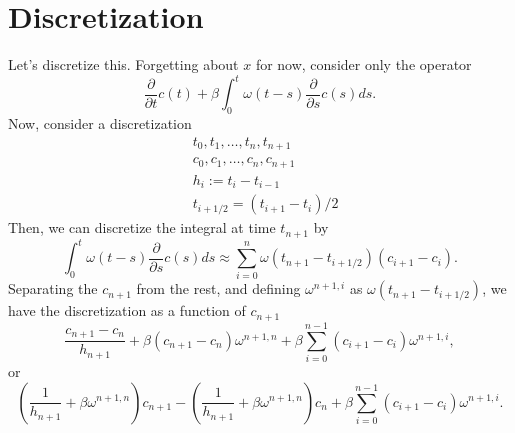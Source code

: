 \documentclass[]{article}
\newcommand{\pderiv}[2]{\frac{\partial #1}{\partial #2}}
\begin{document}
\section{Discretization}
Let's discretize this. Forgetting about $x$ for now, consider only the operator
\begin{equation}
	\pderiv{}{t} c(t) + \beta \int_0^t \omega(t - s) \pderiv{}{s} c(s) ds.
\end{equation}
Now, consider a discretization
\begin{equation}
	\begin{split}
	& t_0, t_1, \ldots, t_n, t_{n+1} \\
	& c_0, c_1, \ldots, c_n, c_{n+1} \\
	& h_i := t_{i} - t_{i-1} \\
	& t_{i+1/2} = (t_{i+1} - t_{i})/2
	\end{split}
\end{equation}
Then, we can discretize the integral at time $t_{n+1}$ by
\begin{equation}
	\int_0^t \omega(t - s) \pderiv{}{s} c(s) ds \approx \sum_{i=0}^n \omega(t_{n+1} - t_{i+{1/2}}) (c_{i+1} - c_{i}).
\end{equation}
Separating the $c_{n+1}$ from the rest, and defining $\omega^{n+1, i}$ as $\omega(t_{n+1} - t_{i+{1/2}})$, we have the discretization as a function of $c_{n+1}$
\begin{equation}
	\frac{c_{n+1} - c_{n}}{h_{n+1}} + \beta (c_{n+1} - c_n) \omega^{n+1, n} + \beta \sum_{i=0}^{n-1} (c_{i+1} - c_i) \omega^{n+1, i},
\end{equation}
or
\begin{equation}
	\left(\frac{1}{h_{n+1}} + \beta \omega^{n+1, n} \right) c_{n+1} - \left(\frac{1}{h_{n+1}} + \beta \omega^{n+1, n} \right) c_{n} + \beta \sum_{i=0}^{n-1} (c_{i+1} - c_i) \omega^{n+1, i}.
\end{equation}
\end{document}
